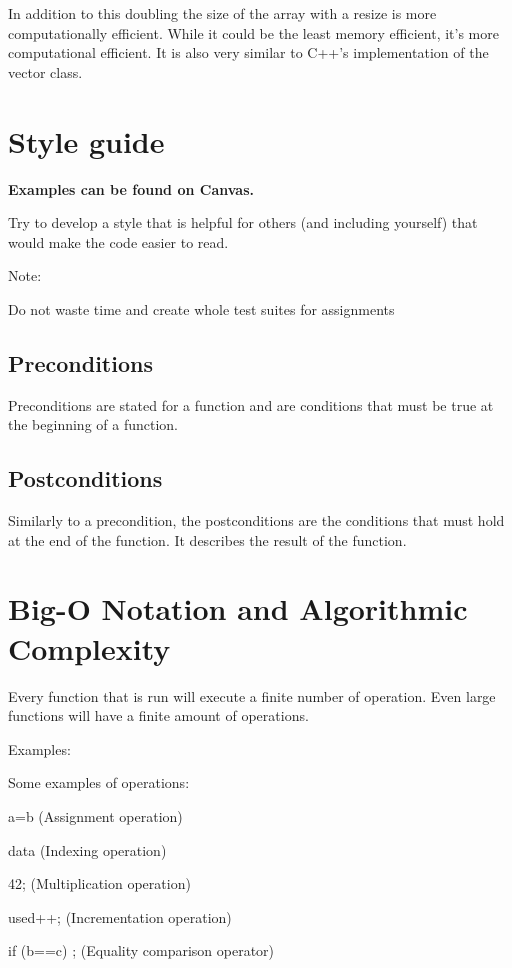 \documentclass[11pt,a4paper,english]{paper}
\begin{document}
  \bigskip

  \noindent In addition to this doubling the size of the array with a resize is more computationally efficient. While it could be the least memory efficient, it's more computational efficient. It is also very similar to C++'s implementation of the vector class.

  \section{Style guide}

  \textbf{Examples can be found on Canvas.}

\noindent Try to develop a style that is helpful for others (and including yourself) that would make the code easier to read.

\begin{mybox}{Note:} {

    Do not waste time and create whole test suites for assignments

  }
\end{mybox}


\subsection{Preconditions}

Preconditions are stated for a function and are conditions that must be true at the beginning of a function.

\subsection{Postconditions}

Similarly to a precondition, the postconditions are the conditions that must hold at the end of the function. It describes the result of the function.


\section{Big-O Notation and Algorithmic Complexity}

Every function that is run will execute a finite number of operation. Even large functions will have a finite amount of operations.

\bigskip

\begin{bluebox}{Examples:}{
Some examples of operations:
\begin{itemize} {
  \item a=b (Assignment operation)
  \item data (Indexing operation)
  \item 42; (Multiplication operation)
  \item used++; (Incrementation operation)
  \item if (b==c) {}; (Equality comparison operator)
} \end{itemize}

  }
\end{bluebox}
\end{document}
